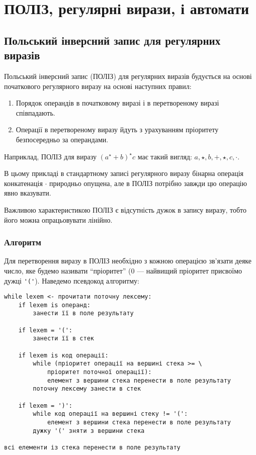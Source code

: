 \setcounter{section}{5}

\section{ПОЛІЗ, регулярні вирази, і автомати}

\subsection{Польський інверсний запис для регулярних виразів}

Польський інверсний запис (ПОЛІЗ) для регулярних виразів будується на основі початкового регулярного виразу на основі наступних правил:
\begin{enumerate}
	\item Порядок операндів в початковому виразі і в перетвореному виразі співпадають.
	\item Операції в перетвореному виразу йдуть з урахуванням пріоритету безпосередньо за операндами.
\end{enumerate}

Наприклад, ПОЛІЗ для виразу $(a^\star+b)^\star c$ має такий вигляд: $a, \star, b, +, \star, c, \cdot$. \medskip

В цьому прикладі в стандартному записі регулярного виразу бінарна операція конкатенація $\cdot$ природньо опущена, але в ПОЛІЗ потрібно завжди цю операцію явно вказувати. \medskip

Важливою характеристикою ПОЛІЗ є відсутність дужок в запису виразу, тобто його можна опрацьовувати лінійно.

\subsubsection{Алгоритм}

Для перетворення виразу в ПОЛІЗ необхідно з кожною операцією зв'язати деяке число, яке будемо називати ``пріоритет'' (0 --- найвищий пріоритет присвоїмо дужці \verb|'('|). Наведемо псевдокод алгоритму:
\begin{verbatim}
while lexem <- прочитати поточну лексему:
    if lexem is операнд:
        занести її в поле результату
	
    if lexem = '(':
        занести її в стек
	
    if lexem is код операції:
        while (пріоритет операції на вершині стека >= \
        	пріоритет поточної операції):
            елемент з вершини стека перенести в поле результату
        поточну лексему занести в стек
	
    if lexem = ')':
        while код операції на вершині стеку != '(':
            елемент з вершини стека перенести в поле результату
        дужку '(' зняти з вершини стека

всі елементи із стека перенести в поле результату
\end{verbatim}

